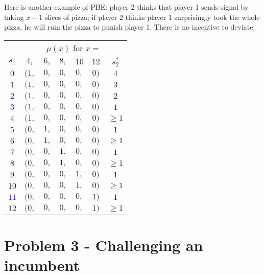 \documentclass{article}
\begin{document}
\begin{mdframed}[backgroundcolor=blue!20,linecolor=white]

Here is another example of PBE: player 2 thinks that player 1 sends signal by taking $x-1$ slices of pizza; if player 2 thinks player 1 surprisingly took the whole pizza, he will ruin the pizza to punish player 1. There is no incentive to deviate.
\begin{center}
\begin{tabular}{|c|ccccc|c|}
\multicolumn{1}{c}{} & \multicolumn{6}{c}{$\mu(x)$ for $x =$}  \\
$s_1$ & $4,$ & $6,$ & $8,$ & $10$ & $12$ & $s_2^*$  \\   \cline{1-7}
$0$ & $(1,$ & $0,$ & $0,$ & $0,$ & $0)$ & $4$ \\   
$1$ & $(1,$ & $0,$ & $0,$ & $0,$ & $0)$ & $3$ \\    
$2$ & $(1,$ & $0,$ & $0,$ & $0,$ & $0)$ & $2$ \\   
\textcolor{blue}{$3$} & $(1,$ & $0,$ & $0,$ & $0,$ & $0)$ & $1$ \\  \hline  
$4$ & $(1,$ & $0,$ & $0,$ & $0,$ & $0)$ & $\ge 1$ \\   
\textcolor{blue}{$5$} & $(0,$ & $1,$ & $0,$ & $0,$ & $0)$ & $1$ \\  \hline  
$6$ & $(0,$ & $1,$ & $0,$ & $0,$ & $0)$ & $\ge 1$ \\   
\textcolor{blue}{$7$} & $(0,$ & $0,$ & $1,$ & $0,$ & $0)$ & $1$ \\   \hline 
$8$ & $(0,$ & $0,$ & $1,$ & $0,$ & $0)$ & $\ge 1$ \\   
\textcolor{blue}{$9$} & $(0,$ & $0,$ & $0,$ & $1,$ & $0)$ & $1$ \\  \hline  
$10$& $(0,$ & $0,$ & $0,$ & $1,$ & $0)$ & $\ge 1$ \\      
\textcolor{blue}{$11$}& $(0,$ & $0,$ & $0,$ & $0,$ & $1)$ & $1$ \\ \hline 
$12$ & $(0,$ & $0,$ & $0,$ & $0,$ & $1)$ & $\ge 1$ \\   
\end{tabular}
\end{center} 

\end{mdframed}

\bigskip

\section{Problem 3 - Challenging an incumbent}
\end{document}
